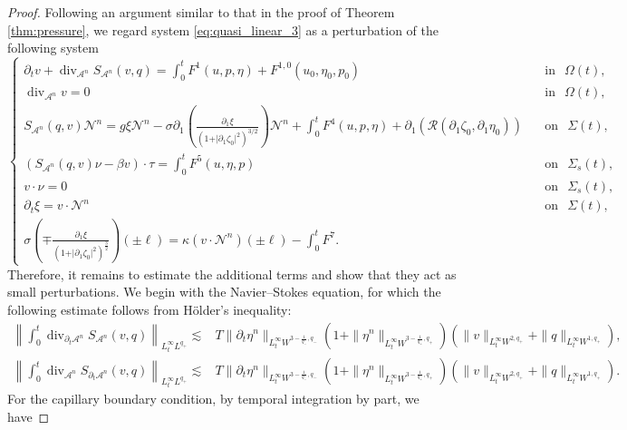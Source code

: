 \documentclass[letterpaper,reqno,10pt,twoside]{amsart}
\theoremstyle{definition}
\theoremstyle{remark}
\def\p{\partial}
\begin{document}
\begin{proof}
		Following an argument similar to that in the proof of Theorem \ref{thm:pressure}, we regard system \eqref{eq:quasi_linear_3} as a perturbation of the following system
		\[
		\begin{cases}
			\partial_{t}v+\operatorname{div}_{\mathcal{A}^{n}}S_{\mathcal{A}^{n}}(v,q)=\int_{0}^{t}F^{1}(u,p,\eta)+F^{1,0}(u_{0},\eta_{0},p_{0})~~~&\operatorname{in}~~\Omega(t),\\
			\operatorname{div}_{\mathcal{A}^{n}}v=0~~~&\operatorname{in}~~\Omega(t),\\
			S_{\mathcal{A}^{n}}(q,v)\mathcal{N}^{n}=g\xi\mathcal{N}^{n}-\sigma\partial_{1}\left(\frac{\p_1\xi}{(1+\vert \partial_{1}\zeta_{0}\vert^{2})^{3/2}} \right)\mathcal{N}^{n}
			+\int_{0}^{t}F^{4}(u,p,\eta)+\p_{1}(\mathcal{R}(\p_{1}\zeta_{0},\p_{1}\eta_{0}))~~~&\operatorname{on}~~\Sigma(t),\\
			(S_{\mathcal{A}^{n}}(q,v)\nu-\beta v)\cdot \tau=\int_{0}^{t}F^{5}(u,\eta,p)~~~&\operatorname{on}~~\Sigma_{s}(t),\\
			v\cdot \nu=0~~~&\operatorname{on}~~\Sigma_{s}(t),\\
			\partial_{t}\xi=v\cdot \mathcal{N}^{n}~~~&\operatorname{on}~~\Sigma(t),\\
			\sigma(\mp \frac{\partial_{1}\xi}{(1+\vert \partial_{1}\zeta_{0}\vert^{2})^{\frac{3}{2}}})(\pm \ell)
			=\kappa (v\cdot \mathcal{N}^{n})(\pm \ell)-\int_{0}^{t}{F}^{7}.
		\end{cases}
		\]
		Therefore, it remains to estimate the additional terms and show that they act as small perturbations. We begin with the Navier–Stokes equation, for which the following estimate follows from Hölder's inequality:
		\[
		\begin{aligned}
			\left     \|\int_{0}^{t}\operatorname{div}_{\p_{t}\mathcal{A}^{n}}S_{\mathcal{A}^{n}}(v,q) \right\|_{L_{t}^{\infty}L^{q_{+}}}\lesssim& T\|\p_{t}\eta^{n}\|_{L_{t}^{\infty}W^{3-\frac{1}{q_{-}},q_{-}}}(1+\|\eta^{n}\|_{L_{t}^{\infty}W^{3-\frac{1}{q_{+}},q_{+}}})(\|v\|_{L_{t}^{\infty}W^{2,q_{+}}}+\|q\|_{L_{t}^{\infty}W^{1,q_{+}}}),\\
			\left\|\int_{0}^{t}\operatorname{div}_{\mathcal{A}^{n}}S_{\p_{t}\mathcal{A}^{n}}(v,q) \right\|_{L_{t}^{\infty}L^{q_{+}}}
			\lesssim& T\|\p_{t}\eta^{n}\|_{L_{t}^{\infty}W^{3-\frac{1}{q_{-}},q_{-}}}(1+\|\eta^{n}\|_{L_{t}^{\infty}W^{3-\frac{1}{q_{+}},q_{+}}})(\|v\|_{L_{t}^{\infty}W^{2,q_{+}}}+\|q\|_{L_{t}^{\infty}W^{1,q_{+}}}).
		\end{aligned}
		\]
		For the capillary boundary condition, by temporal integration by part, we have

\end{proof}
\end{document}
